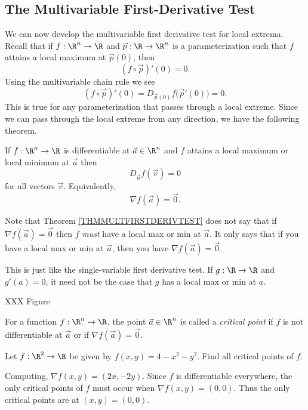 \subsection{The Multivariable First-Derivative Test}

We can now develop the multivariable first derivative test for local extrema.
Recall that if $f:\R^n\to\R$ and $\vec p:\R\to\R^n$ is a parameterization such
that $f$ attains a local maximum at $\vec p(0)$, then
\[
	(f\circ \vec p)'(0)=0.
\]
Using the multivariable chain rule we see
\[
	(f\circ \vec p)'(0) = D_{\vec p(0)} f\big(\vec p'(0)\big) = 0.
\]
This is true for any parameterization that passes through a local extreme.
Since we can pass through the local extreme from any direction, we have the following
theorem.

\begin{theorem}
	\label{THMMULTFIRSTDERIVTEST}
	If $f:\R^n\to\R$ is differentiable at $\vec a\in\R^n$ and $f$ attains a
	local maximum or local minimum at $\vec a$ then 
	\[
		D_{\vec a}f(\vec v) = 0
	\]
	for all vectors $\vec v$.  Equivalently,
	\[
		\nabla f(\vec a)=\vec 0.
	\]
\end{theorem}
Note that Theorem \ref{THMMULTFIRSTDERIVTEST} does not say that if $\nabla f(\vec a)=\vec 0$
then $f$ \emph{must} have a local max or min at $\vec a$.  It only says that if
you have a local max or min at $\vec a$, then you have $\nabla f(\vec a)=\vec 0$.

This is just like the single-variable first derivative test.  If $g:\R\to\R$ and $g'(a)=0$,
it need not be the case that $g$ has a local max or min at $a$.

XXX Figure

\begin{definition}
	For a function $f:\R^n\to\R$, the point $\vec a\in\R^n$ is called
	a \emph{critical point} if $f$ is not
	differentiable at $\vec a$ or if $\nabla f(\vec a)=\vec 0$.
\end{definition}

\begin{example}
	Let $f:\R^2\to\R$ be given by $f(x,y)=4-x^2-y^2$.  Find all critical
	points of $f$.

	Computing, $\nabla f(x,y) = (2x,-2y)$.  Since $f$ is differentiable everywhere,
	the only critical points of $f$ must occur when $\nabla f(x,y)=(0,0)$.  Thus the only
	critical points are at $(x,y)=(0,0)$.
\end{example}

